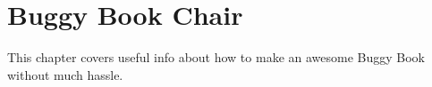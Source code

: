 \chapter{Buggy Book Chair}
This chapter covers useful info about how to make an awesome Buggy Book
without much hassle.
